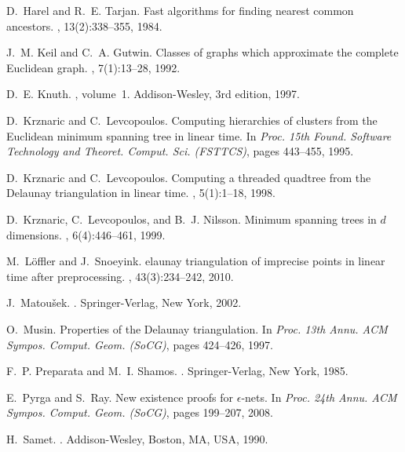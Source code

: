 \documentclass[11pt]{paper}
\begin{document}
\begin{thebibliography}{10}
D.~Harel and R.~E. Tarjan.
\newblock Fast algorithms for finding nearest common ancestors.
, 13(2):338--355, 1984.

J.~M. Keil and C.~A. Gutwin.
\newblock Classes of graphs which approximate the complete {E}uclidean graph.
, 7(1):13--28, 1992.

D.~E. Knuth.
,
  volume~1.
\newblock Addison-Wesley, 3rd edition, 1997.

D.~Krznaric and C.~Levcopoulos.
\newblock Computing hierarchies of clusters from the {E}uclidean minimum
  spanning tree in linear time.
\newblock In {\em Proc. 15th Found. Software Technology and Theoret. Comput.
  Sci. (FSTTCS)}, pages 443--455, 1995.

D.~Krznaric and C.~Levcopoulos.
\newblock Computing a threaded quadtree from the {D}elaunay triangulation in
  linear time.
, 5(1):1--18, 1998.

D.~Krznaric, C.~Levcopoulos, and B.~J. Nilsson.
\newblock Minimum spanning trees in $d$ dimensions.
, 6(4):446--461, 1999.

M.~L{\"o}ffler and J.~Snoeyink.
elaunay triangulation of imprecise points in linear time after
  preprocessing.
, 43(3):234--242, 2010.

J.~Matou{\v{s}}ek.
.
\newblock Springer-Verlag, New York, 2002.

O.~Musin.
\newblock Properties of the {Delaunay} triangulation.
\newblock In {\em Proc. 13th Annu. ACM Sympos. Comput. Geom. (SoCG)}, pages
  424--426, 1997.

F.~P. Preparata and M.~I. Shamos.
.
\newblock Springer-Verlag, New York, 1985.

E.~Pyrga and S.~Ray.
\newblock New existence proofs for {$\epsilon$}-nets.
\newblock In {\em Proc. 24th Annu. ACM Sympos. Comput. Geom. (SoCG)}, pages
  199--207, 2008.

H.~Samet.
.
\newblock Addison-Wesley, Boston, MA, USA, 1990.


\end{thebibliography}
\end{document}
